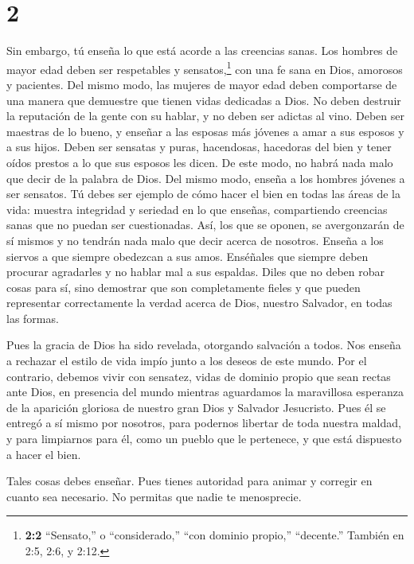 \hypertarget{section-1}{%
\section{2}\label{section-1}}

 Sin embargo, tú enseña lo que está acorde a las creencias
sanas.  Los hombres de mayor edad deben ser respetables y
sensatos,\footnote{\textbf{2:2} ``Sensato,'' o ``considerado,'' ``con
  dominio propio,'' ``decente.'' También en 2:5, 2:6, y 2:12.} con una
fe sana en Dios, amorosos y pacientes.  Del mismo modo, las
mujeres de mayor edad deben comportarse de una manera que demuestre que
tienen vidas dedicadas a Dios. No deben destruir la reputación de la
gente con su hablar, y no deben ser adictas al vino.  Deben
ser maestras de lo bueno, y enseñar a las esposas más jóvenes a amar a
sus esposos y a sus hijos.  Deben ser sensatas y puras,
hacendosas, hacedoras del bien y tener oídos prestos a lo que sus
esposos les dicen. De este modo, no habrá nada malo que decir de la
palabra de Dios.  Del mismo modo, enseña a los hombres
jóvenes a ser sensatos.  Tú debes ser ejemplo de cómo hacer
el bien en todas las áreas de la vida: muestra integridad y seriedad en
lo que enseñas,  compartiendo creencias sanas que no puedan
ser cuestionadas. Así, los que se oponen, se avergonzarán de sí mismos y
no tendrán nada malo que decir acerca de nosotros.  Enseña a
los siervos a que siempre obedezcan a sus amos. Enséñales que siempre
deben procurar agradarles y no hablar mal a sus espaldas. 
Diles que no deben robar cosas para sí, sino demostrar que son
completamente fieles y que pueden representar correctamente la verdad
acerca de Dios, nuestro Salvador, en todas las formas.

 Pues la gracia de Dios ha sido revelada, otorgando
salvación a todos.  Nos enseña a rechazar el estilo de vida
impío junto a los deseos de este mundo. Por el contrario, debemos vivir
con sensatez, vidas de dominio propio que sean rectas ante Dios, en
presencia del mundo  mientras aguardamos la maravillosa
esperanza de la aparición gloriosa de nuestro gran Dios y Salvador
Jesucristo.  Pues él se entregó a sí mismo por nosotros,
para podernos libertar de toda nuestra maldad, y para limpiarnos para
él, como un pueblo que le pertenece, y que está dispuesto a hacer el
bien.

 Tales cosas debes enseñar. Pues tienes autoridad para
animar y corregir en cuanto sea necesario. No permitas que nadie te
menosprecie.

